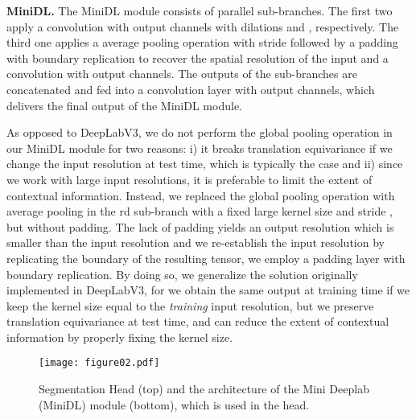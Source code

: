 \documentclass[10pt,twocolumn,letterpaper]{article}
\renewcommand{\paragraph}[1]{
        \vspace{3pt}
	\noindent\textbf{#1}}
\begin{document}
\paragraph{MiniDL.}
The MiniDL module consists of  parallel sub-branches. The first two apply a  convolution with  output channels with dilations  and , respectively. The third one applies a  average pooling operation with stride  followed by a padding with boundary replication to recover the spatial resolution of the input and a  convolution with  output channels. The outputs of the  sub-branches are concatenated and fed into a  convolution layer with  output channels, which delivers the final output of the MiniDL module. 

\paragraph{} As opposed to DeepLabV3, we do not perform the global pooling operation in our MiniDL module for two reasons: i) it breaks translation equivariance if we change the input resolution at test time, which is typically the case and ii) since we work with large input resolutions, it is preferable to limit the extent of contextual information. Instead, we replaced the global pooling operation with average pooling in the rd sub-branch with a fixed large kernel size and stride , but without padding. The lack of padding yields an output resolution which is smaller than the input resolution and we re-establish the input resolution by replicating the boundary of the resulting tensor, \ie we employ a padding layer with boundary replication. By doing so, we generalize the solution originally implemented in DeepLabV3, for we obtain the same output at training time if we keep the kernel size equal to the \emph{training} input resolution, but we preserve translation equivariance at test time, and can reduce the extent of contextual information by properly fixing the kernel size.

\begin{figure}[ht]
	\centering
	\texttt{[image: figure02.pdf]}
	\caption{Segmentation Head (top) and the architecture of the Mini Deeplab (MiniDL) module (bottom), which is used in the head.}
	\label{fig:minidl}
	\vspace{-10pt}
\end{figure}
\end{document}
